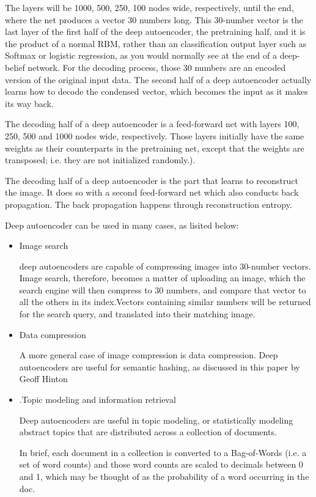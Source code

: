 \begin{bigabstract}
	The layers will be 1000, 500, 250, 100 nodes wide, respectively, until the end, where the net produces a vector 30 numbers long. This 30-number vector is the last layer of the first half of the deep autoencoder, the pretraining half, and it is the product of a normal RBM, rather than an classification output layer such as Softmax or logistic regression, as you would normally see at the end of a deep-belief network.
For the decoding process, those 30 numbers are an encoded version of the original input data. The second half of a deep autoencoder actually learns how to decode the condensed vector, which becomes the input as it makes its way back.

	The decoding half of a deep autoencoder is a feed-forward net with layers 100, 250, 500 and 1000 nodes wide, respectively. Those layers initially have the same weights as their counterparts in the pretraining net, except that the weights are transposed; i.e. they are not initialized randomly.).

	The decoding half of a deep autoencoder is the part that learns to reconstruct the image. It does so with a second feed-forward net which also conducts back propagation. The back propagation happens through reconstruction entropy.

Deep autoencoder can be used in many cases, as lisited below:
\begin{itemize}
\item Image search

	deep autoencoders are capable of compressing images into 30-number vectors. Image search, therefore, becomes a matter of uploading an image, which the search engine will then compress to 30 numbers, and compare that vector to all the others in its index.Vectors containing similar numbers will be returned for the search query, and translated into their matching image.
\item Data compression

	A more general case of image compression is data compression. Deep autoencoders are useful for semantic hashing, as discussed in this paper by Geoff Hinton
\item .Topic modeling and information retrieval 

	Deep autoencoders are useful in topic modeling, or statistically modeling abstract topics that are distributed across a collection of documents.

	In brief, each document in a collection is converted to a Bag-of-Words (i.e. a set of word counts) and those word counts are scaled to decimals between 0 and 1, which may be thought of as the probability of a word occurring in the doc.
	

\end{itemize}
\end{bigabstract}
